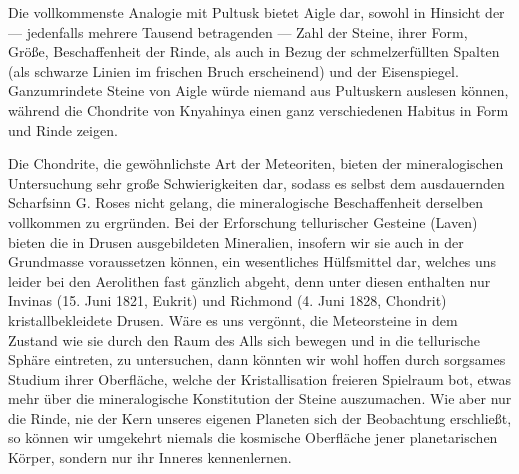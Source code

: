 \documentclass[a4paper, 11pt, oneside, german]{article}
\begin{document}
Die vollkommenste Analogie mit Pultusk bietet Aigle dar, sowohl in Hinsicht der --- jedenfalls mehrere Tausend betragenden --- Zahl der Steine, ihrer Form, Größe, Beschaffenheit der Rinde, als auch in Bezug der schmelzerfüllten Spalten (als schwarze Linien im frischen Bruch erscheinend) und der Eisenspiegel. Ganzumrindete Steine von Aigle würde niemand aus Pultuskern auslesen können, während die Chondrite von Knyahinya einen ganz verschiedenen Habitus in Form und Rinde zeigen.

Die Chondrite, die gewöhnlichste Art der Meteoriten, bieten der mineralogischen Untersuchung sehr große Schwierigkeiten dar, sodass es selbst dem ausdauernden Scharfsinn G. Roses nicht gelang, die mineralogische Beschaffenheit derselben vollkommen zu ergründen. Bei der Erforschung tellurischer Gesteine (Laven) bieten die in Drusen ausgebildeten Mineralien, insofern wir sie auch in der Grundmasse voraussetzen können, ein wesentliches Hülfsmittel dar, welches uns leider bei den Aerolithen fast gänzlich abgeht, denn unter diesen enthalten nur Invinas (15. Juni 1821, Eukrit) und Richmond (4. Juni 1828, Chondrit) kristallbekleidete Drusen. Wäre es uns vergönnt, die Meteorsteine in dem Zustand wie sie durch den Raum des Alls sich bewegen und in die tellurische Sphäre eintreten, zu untersuchen, dann könnten wir wohl hoffen durch sorgsames Studium ihrer Oberfläche, welche der Kristallisation freieren Spielraum bot, etwas mehr über die mineralogische Konstitution der Steine auszumachen. Wie aber nur die Rinde, nie der Kern unseres eigenen Planeten sich der Beobachtung erschließt, so können wir umgekehrt niemals die kosmische Oberfläche jener planetarischen Körper, sondern nur ihr Inneres kennenlernen.
\end{document}
